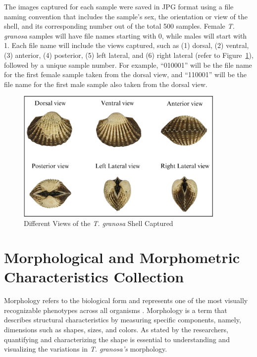 The images captured for each sample were saved in JPG format using a file naming convention that includes the sample's sex, the orientation or view of the shell, and its corresponding number out of the total 500 samples. Female \textit{T. granosa} samples will have file names starting with 0, while males will start with 1. Each file name will include the views captured, such as (1) dorsal, (2) ventral, (3) anterior, (4) posterior, (5) left lateral, and (6) right lateral (refer to Figure~\ref{fig:granosa_views}), followed by a unique sample number. For example, “010001” will be the file name for the first female sample taken from the dorsal view, and “110001” will be the file name for the first male sample also taken from the dorsal view. 

\begin{figure}[!htbp]
	\centering
	\includegraphics[width=0.9\textwidth]{figures/view.png}
	\caption{Different Views of the \textit{T. granosa} Shell Captured}
	\label{fig:granosa_views}
\end{figure}

\newpage
\section{Morphological and Morphometric Characteristics Collection}
\label{sec:morphochar}

Morphology refers to the biological form and represents one of the most visually recognizable phenotypes across all organisms \cite{tsutsumi2023}. Morphology is a term that describes structural characteristics by measuring specific components, namely, dimensions such as shapes, sizes, and colors. As stated by the researchers, quantifying and characterizing the shape is essential to understanding and visualizing the variations in \textit{T. granosa’s} morphology. 


